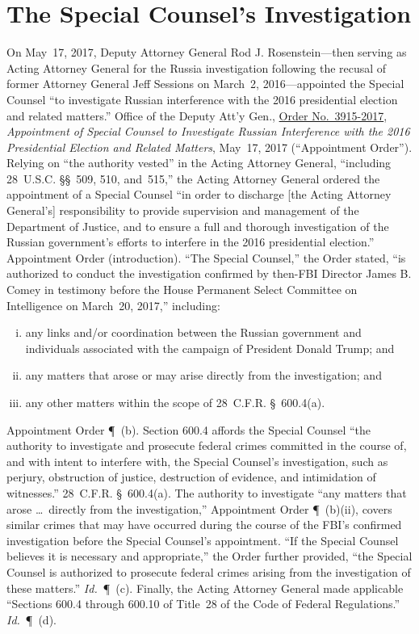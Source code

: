 \section{The Special Counsel's Investigation}

On May~17, 2017, Deputy Attorney General Rod J. Rosenstein---then serving as Acting Attorney General for the Russia investigation following the recusal of former Attorney General Jeff Sessions on March~2, 2016---appointed the Special Counsel ``to investigate Russian interference with the 2016 presidential election and related matters.''
Office of the Deputy Att'y Gen., \hyperlink{section.3.1}{Order No.~3915-2017}, \textit{Appointment of Special Counsel to Investigate Russian Interference with the 2016 Presidential Election and Related Matters}, May~17, 2017 (``Appointment Order'').
Relying on ``the authority vested'' in the Acting Attorney General, ``including 28~U.S.C. \S\S~509, 510, and~515,'' the Acting Attorney General ordered the appointment of a Special Counsel ``in order to discharge [the Acting Attorney General's] responsibility to provide supervision and management of the Department of Justice, and to ensure a full and thorough investigation of the Russian government's efforts to interfere in the 2016 presidential election.'' Appointment Order (introduction).
``The Special Counsel,'' the Order stated, ``is authorized to conduct the investigation confirmed by then-FBI Director James B. Comey in testimony before the House Permanent Select Committee on Intelligence on March~20, 2017,'' including:

\begin{enumerate}[(i)]
  \item any links and/or coordination between the Russian government and individuals associated with the campaign of President Donald Trump; and
  \item any matters that arose or may arise directly from the investigation; and
  \item any other matters within the scope of 28~C.F.R. \S~600.4(a).
\end{enumerate}

Appointment Order \P~(b). Section 600.4 affords the Special Counsel ``the authority to investigate and prosecute federal crimes committed in the course of, and with intent to interfere with, the Special Counsel's investigation, such as perjury, obstruction of justice, destruction of evidence, and intimidation of witnesses.'' 28~C.F.R. \S~600.4(a).
The authority to investigate ``any matters that arose \dots\ directly from the investigation,'' Appointment Order \P~(b)(ii), covers similar crimes that may have occurred during the course of the FBI's confirmed investigation before the Special Counsel's appointment.
``If the Special Counsel believes it is necessary and appropriate,'' the Order further provided, ``the Special Counsel is authorized to prosecute federal crimes arising from the investigation of these matters.'' \textit{Id.}~\P~(c).
Finally, the Acting Attorney General made applicable ``Sections 600.4 through 600.10 of Title~28 of the Code of Federal Regulations.'' \textit{Id.}~\P~(d).

